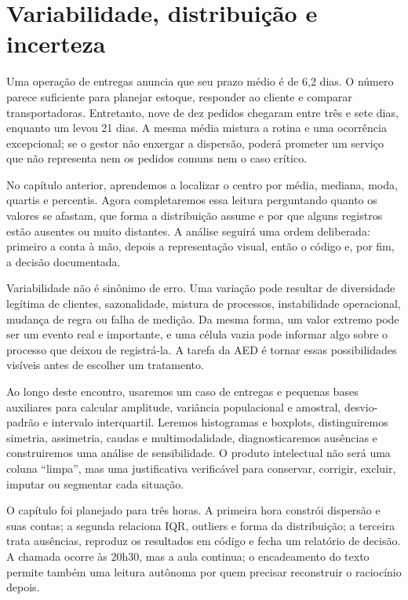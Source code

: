 \chapter{Variabilidade, distribuição e incerteza}

Uma operação de entregas anuncia que seu prazo médio é de 6,2 dias. O número parece suficiente para planejar estoque, responder ao cliente e comparar transportadoras. Entretanto, nove de dez pedidos chegaram entre três e sete dias, enquanto um levou 21 dias. A mesma média mistura a rotina e uma ocorrência excepcional; se o gestor não enxergar a dispersão, poderá prometer um serviço que não representa nem os pedidos comuns nem o caso crítico.

No capítulo anterior, aprendemos a localizar o centro por média, mediana, moda, quartis e percentis. Agora completaremos essa leitura perguntando quanto os valores se afastam, que forma a distribuição assume e por que alguns registros estão ausentes ou muito distantes. A análise seguirá uma ordem deliberada: primeiro a conta à mão, depois a representação visual, então o código e, por fim, a decisão documentada.

Variabilidade não é sinônimo de erro. Uma variação pode resultar de diversidade legítima de clientes, sazonalidade, mistura de processos, instabilidade operacional, mudança de regra ou falha de medição. Da mesma forma, um valor extremo pode ser um evento real e importante, e uma célula vazia pode informar algo sobre o processo que deixou de registrá-la. A tarefa da AED é tornar essas possibilidades visíveis antes de escolher um tratamento.

Ao longo deste encontro, usaremos um caso de entregas e pequenas bases auxiliares para calcular amplitude, variância populacional e amostral, desvio-padrão e intervalo interquartil. Leremos histogramas e boxplots, distinguiremos simetria, assimetria, caudas e multimodalidade, diagnosticaremos ausências e construiremos uma análise de sensibilidade. O produto intelectual não será uma coluna ``limpa'', mas uma justificativa verificável para conservar, corrigir, excluir, imputar ou segmentar cada situação.

O capítulo foi planejado para três horas. A primeira hora constrói dispersão e suas contas; a segunda relaciona IQR, outliers e forma da distribuição; a terceira trata ausências, reproduz os resultados em código e fecha um relatório de decisão. A chamada ocorre às 20h30, mas a aula continua; o encadeamento do texto permite também uma leitura autônoma por quem precisar reconstruir o raciocínio depois.

